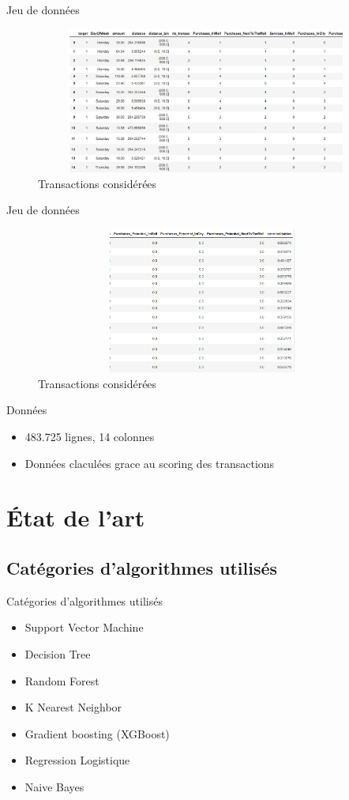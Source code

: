 \documentclass[xelatex,12pt]{beamer}
\begin{document}
\begin{frame}{Jeu de données}
\begin{figure}[H]
    \includegraphics[width=12cm,height=4.8cm]{images/dataset_1.png}
    \caption{ Transactions considérées}
    \label{fig:L1}
\end{figure}
\end{frame}
\begin{frame}{Jeu de données}
\begin{figure}[H]
    \includegraphics[width=11cm,height=4.8cm]{images/dataset_2.png}
    \caption{ Transactions considérées}
    \label{fig:L1}
\end{figure}
\end{frame} 

\begin{frame}{Données}
  \begin{itemize}
  \item 483.725 lignes, 14 colonnes
  \item Données claculées grace au scoring des transactions 
  \end{itemize}
\end{frame}

\section{État de l'art}
\subsection{Catégories d'algorithmes utilisés}
\begin{frame}{Catégories d'algorithmes utilisés}
  \begin{itemize}
  \item Support Vector Machine
  \item Decision Tree
  \item Random Forest
  \item K Nearest Neighbor
  \item Gradient boosting (XGBoost)
  \item Regression Logistique
  \item Naive Bayes
  \end{itemize}
\end{frame}
\end{document}
